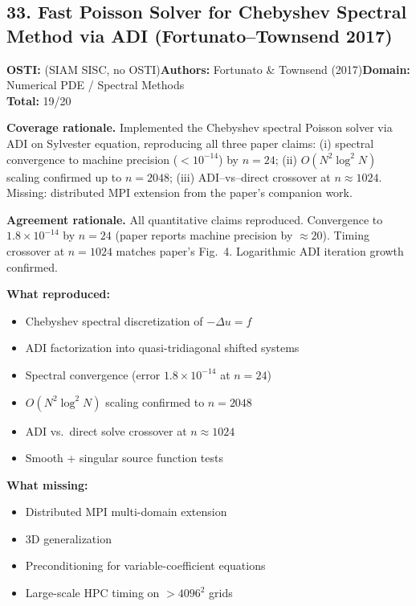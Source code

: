 \subsection{33. Fast Poisson Solver for Chebyshev Spectral Method via ADI (Fortunato--Townsend 2017)}
\textbf{OSTI:} (SIAM SISC, no OSTI)\quad\textbf{Authors:} Fortunato \& Townsend (2017)\quad\textbf{Domain:} Numerical PDE / Spectral Methods\\
\quad{}\quad\textbf{Total:} 19/20\par\smallskip
\noindent\textbf{Coverage rationale.} Implemented the Chebyshev spectral Poisson solver via ADI on Sylvester equation, reproducing all three paper claims: (i) spectral convergence to machine precision ($<10^{-14}$) by $n=24$; (ii) $O(N^2 \log^2 N)$ scaling confirmed up to $n=2048$; (iii) ADI--vs--direct crossover at $n\approx 1024$. Missing: distributed MPI extension from the paper's companion work.\par
\noindent\textbf{Agreement rationale.} All quantitative claims reproduced. Convergence to $1.8\times10^{-14}$ by $n=24$ (paper reports machine precision by $\approx 20$). Timing crossover at $n=1024$ matches paper's Fig.~4. Logarithmic ADI iteration growth confirmed.\par\smallskip
\noindent\textbf{What reproduced:}
\begin{itemize}[leftmargin=1.4em,itemsep=0.2em,topsep=0.2em]
\item Chebyshev spectral discretization of $-\Delta u = f$
\item ADI factorization into quasi-tridiagonal shifted systems
\item Spectral convergence (error $1.8\times10^{-14}$ at $n=24$)
\item $O(N^2\log^2 N)$ scaling confirmed to $n=2048$
\item ADI vs.\ direct solve crossover at $n\approx 1024$
\item Smooth + singular source function tests
\end{itemize}
\noindent\textbf{What missing:}
\begin{itemize}[leftmargin=1.4em,itemsep=0.2em,topsep=0.2em]
\item Distributed MPI multi-domain extension
\item 3D generalization
\item Preconditioning for variable-coefficient equations
\item Large-scale HPC timing on $>4096^2$ grids
\end{itemize}
